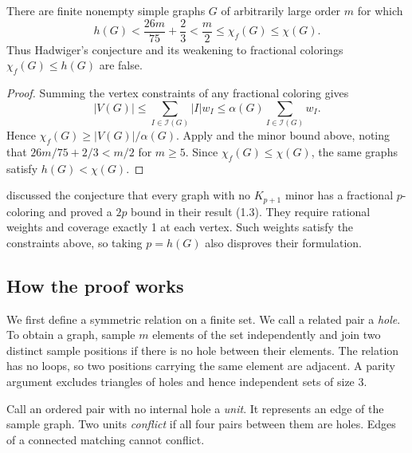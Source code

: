 \begin{corollary}\label{cor:hadwiger}\label{cor:fractional-hadwiger}
There are finite nonempty simple graphs \(G\) of arbitrarily large
order \(m\) for which
\[
 h(G)<\frac{26m}{75}+\frac23
 <\frac m2\le\chi_f(G)\le\chi(G).
\]
Thus Hadwiger's conjecture and its weakening to fractional colorings
\(\chi_f(G)\le h(G)\) are false.
\end{corollary}
\begin{proof}
Summing the vertex constraints of any fractional coloring gives
\[
 |V(G)|\le\sum_{I\in\mathcal I(G)}|I|w_I
       \le\alpha(G)\sum_{I\in\mathcal I(G)}w_I.
\]
Hence \(\chi_f(G)\ge |V(G)|/\alpha(G)\). Apply
 and the minor bound above, noting that
\(26m/75+2/3<m/2\) for \(m\ge5\).
Since \(\chi_f(G)\le\chi(G)\), the same graphs satisfy \(h(G)<\chi(G)\).
\end{proof}

\citet[p.~148]{reedseymour1998} discussed the conjecture that every graph with no
\(K_{p+1}\) minor has a fractional \(p\)-coloring and proved a
\(2p\) bound in their result (1.3). They require rational weights
and coverage exactly 1 at each vertex. Such weights satisfy the
constraints above, so taking \(p=h(G)\) also disproves their formulation.




\subsection{How the proof works}

We first define a symmetric relation on a finite set. We call a related
pair a \emph{hole}. To obtain a graph, sample \(m\) elements of the set
independently and join two distinct sample positions if there is no hole
between their elements. The relation has no loops, so two positions
carrying the same element are adjacent. A parity argument excludes
triangles of holes and hence independent sets of size 3.

Call an ordered pair with no internal hole a \emph{unit}. It represents
an edge of the sample graph. Two units \emph{conflict} if all four pairs
between them are holes. Edges of a connected matching cannot conflict.

